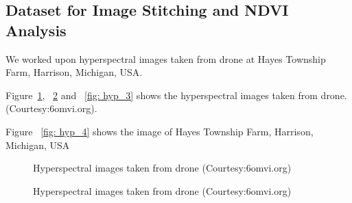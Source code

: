 \subsection{Dataset for Image Stitching and NDVI Analysis}

We worked upon hyperspectral images taken from drone at Hayes Township Farm, Harrison, Michigan, USA.

Figure~\ref{fig: hyp_1}, ~\ref{fig: hyp_2} and ~\ref{fig: hyp_3} shows the hyperspectral images taken from drone. (Courtesy:6omvi.org).

Figure ~\ref{fig: hyp_4} shows the image of Hayes Township Farm, Harrison, Michigan, USA


\begin{figure}[!h]
	\hfill
	\hfill
	\hfill
	\caption{\label{fig: hyp_1}Hyperspectral images taken from drone (Courtesy:6omvi.org)}
\end{figure}


\begin{figure}[!h]
	\hfill
	\hfill
	\hfill
	\caption{\label{fig: hyp_2}Hyperspectral images taken from drone (Courtesy:6omvi.org)}
\end{figure}

